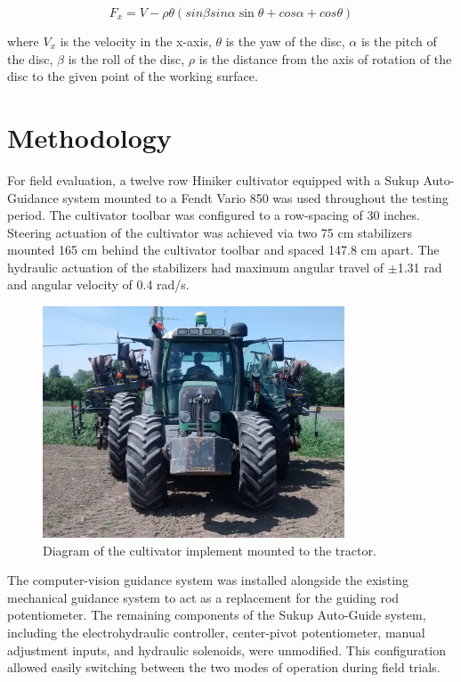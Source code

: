 \documentclass[authoryear]{elsarticle}
\begin{document}
\begin{equation}
  F_x = V - \rho\theta(sin \beta sin \alpha \sin \theta + cos \alpha +
  cos \theta)
  \label{eq:horizontal_velocity}
\end{equation}
\begin{flushleft}
where $V_x$ is the velocity in the x-axis, $\theta$ is the yaw of the
disc, $\alpha$ is the pitch of the
disc, $\beta$ is the roll of the disc, $\rho$ is the distance from
the axis of rotation of the disc to the given point of the working surface.
\end{flushleft}

\section{Methodology}
For field evaluation, a twelve row Hiniker cultivator equipped with a
Sukup Auto-Guidance system mounted to a Fendt Vario 850 was used
throughout the testing period. The cultivator toolbar was configured
to a row-spacing of 30 inches. Steering actuation of the cultivator
was achieved via two 75 cm stabilizers mounted 165 cm behind the
cultivator toolbar and spaced 147.8 cm apart. The hydraulic actuation
of the stabilizers had maximum angular travel of $\pm$1.31 rad and angular
velocity of 0.4 rad/s.

\begin{figure}
  \centering
  \includegraphics[width=0.8\textwidth,natwidth=610,natheight=642]{fendt_front.jpg}
  \caption{Diagram of the cultivator implement mounted to the tractor.}
\end{figure}

The computer-vision guidance system was installed alongside the
existing mechanical guidance system to act as a replacement for the
guiding rod potentiometer. The remaining components of the Sukup
Auto-Guide system, including the electrohydraulic controller,
center-pivot potentiometer, manual adjustment inputs, and hydraulic
solenoids, were unmodified. This configuration allowed easily
switching between the two modes of operation during field trials.
\end{document}
